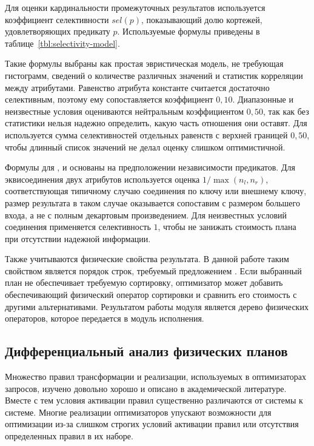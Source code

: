 \documentclass[14pt, russian]{scrartcl}
\begin{document}
Для оценки кардинальности промежуточных результатов используется коэффициент
селективности \(sel(p)\), показывающий долю кортежей, удовлетворяющих предикату
\(p\). Используемые формулы приведены в таблице~\ref{tbl:selectivity-model}.

Такие формулы выбраны как простая эвристическая модель, не требующая гистограмм,
сведений о количестве различных значений и статистик корреляции между
атрибутами. Равенство атрибута константе считается достаточно селективным,
поэтому ему сопоставляется коэффициент \(0{,}10\). Диапазонные и неизвестные
условия оцениваются нейтральным коэффициентом \(0{,}50\), так как без статистики
нельзя надежно определить, какую часть отношения они оставят. Для 
используется сумма селективностей отдельных равенств с верхней границей
\(0{,}50\), чтобы длинный список значений не делал оценку слишком оптимистичной.

Формулы для ,  и  основаны на предположении
независимости предикатов. Для эквисоединения двух атрибутов используется оценка
\(1 / \max(n_l, n_r)\), соответствующая типичному случаю соединения по ключу или
внешнему ключу, размер результата в таком случае оказывается сопоставим с
размером большего входа, а не с полным декартовым произведением. Для неизвестных
условий соединения применяется селективность \(1\), чтобы не занижать стоимость
плана при отсутствии надежной информации.

Также учитываются физические свойства результата. В данной работе таким
свойством является порядок строк, требуемый предложением \ORDERBY{}. Если
выбранный план не обеспечивает требуемую сортировку, оптимизатор может добавить
обеспечивающий физический оператор сортировки и сравнить его стоимость с другими
альтернативами. Результатом работы модуля является дерево физических операторов,
которое передается в модуль исполнения.

\subsection{Дифференциальный анализ физических планов}

Множество правил трансформации и реализации, используемых в
оптимизаторах запросов, изучено довольно хорошо и описано в
академической литературе. Вместе с тем условия активации правил
существенно различаются от системы к системе. Многие реализации
оптимизаторов упускают возможности для оптимизации из-за слишком
строгих условий активации правил или отсутствия определенных правил
в их наборе.
\end{document}
